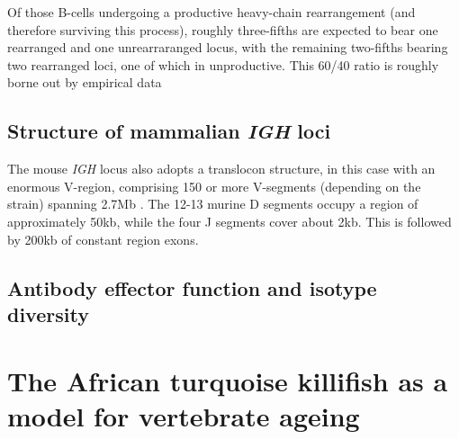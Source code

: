 Of those B-cells undergoing a productive heavy-chain rearrangement (and therefore surviving this process), roughly three-fifths are expected to bear one rearranged and one unrearraranged locus, with the remaining two-fifths bearing two rearranged loci, one of which in unproductive. This 60/40 ratio is roughly borne out by empirical data 


\subsection{Structure of mammalian \textit{IGH} loci} %


The mouse \textit{IGH} locus also adopts a translocon structure, in this case with an enormous V-region, comprising 150 or more V-segments (depending on the strain) spanning 2.7Mb \citep{jung2006vdjr}. The 12-13 murine D segments occupy a region of approximately 50kb, while the four J segments cover about 2kb. This is followed by 200kb of constant region exons. 


\subsection{Antibody effector function and isotype diversity}



\newpage
\section{The African turquoise killifish as a model for vertebrate ageing}




